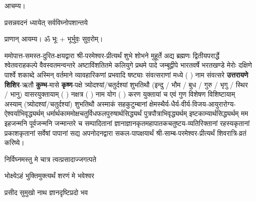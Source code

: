 
\setlength{\parindent}{0pt}

आचम्य।

{प्रसन्नवदनं ध्यायेत् सर्वविघ्नोपशान्तये}
 
प्राणान्  आयम्य।  ॐ भूः + भूर्भुवः॒ सुव॒रोम्।


ममोपात्त-समस्त-दुरित-क्षयद्वारा श्री-परमेश्वर-प्रीत्यर्थं शुभे शोभने मुहूर्ते अद्य ब्रह्मणः
द्वितीयपरार्द्धे श्वेतवराहकल्पे वैवस्वतमन्वन्तरे अष्टाविंशतितमे कलियुगे प्रथमे पादे
जम्बूद्वीपे भारतवर्षे भरतखण्डे मेरोः दक्षिणे पार्श्वे शकाब्दे अस्मिन् वर्तमाने व्यावहारिकणां
 प्रभवादि षष्ट्याः संवत्सराणां मध्ये (	) नाम संवत्सरे \textbf{उत्तरायणे} 
\textbf{शिशिर}-ऋतौ  \textbf{कुम्भ}-मासे \textbf{कृष्ण}-पक्षे त्र्योदश्यां/चतुर्दश्यां शुभतिथौ
(इन्दु / भौम / बुध / गुरु / भृगु / स्थिर / भानु) वासरयुक्तायाम्
(  ) नक्षत्र (  ) नाम  योग  (  ) करण युक्तायां च एवं गुण विशेषण विशिष्टायाम्
अस्याम् (त्र्योदश्यां/चतुर्दश्यां) शुभतिथौ 
अस्माकं सहकुटुम्बानां क्षेमस्थैर्य-धैर्य-वीर्य-विजय-आयुरारोग्य-ऐश्वर्याभिवृद्ध्यर्थम्
 धर्मार्थकाममोक्ष\-चतुर्विधफलपुरुषार्थसिद्ध्यर्थं पुत्रपौत्राभि\-वृद्ध्यर्थम् इष्टकाम्यार्थसिद्ध्यर्थम्
मम इहजन्मनि पूर्वजन्मनि जन्मान्तरे च सम्पादितानां ज्ञानाज्ञानकृतमहा\-पातकचतुष्टय-व्यतिरिक्तानां रहस्यकृतानां प्रकाशकृतानां सर्वेषां पापानां सद्य अपनोदनद्वारा सकल-पापक्षयार्थं श्री-साम्ब-परमेश्वर-प्रीत्यर्थं शिवरात्रि-व्रतं करिष्ये।

{निर्विघ्नमस्तु मे चात्र त्वत्प्रसादाज्जगत्पते}

{भोक्ष्येऽहं भुक्तिमुक्त्यर्थं शरणं मे भवेश्वर}


















{प्रसीद सुमुखो नाथ ज्ञानदृष्टिप्रदो भव}

\closesection

